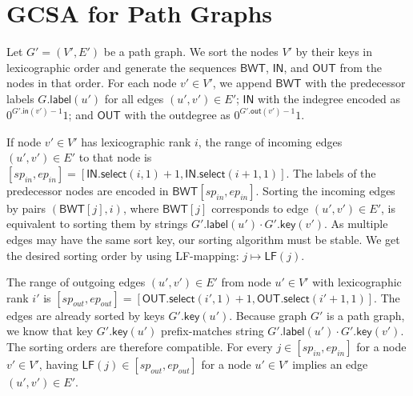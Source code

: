 \documentclass[twoside,leqno,twocolumn]{article}
\newcommand{\select}{\ensuremath{\mathsf{select}}}
\newcommand{\LF}{\ensuremath{\mathsf{LF}}}
\newcommand{\gindegree}{\ensuremath{\mathsf{in}}}
\newcommand{\goutdegree}{\ensuremath{\mathsf{out}}}
\newcommand{\glabel}{\ensuremath{\mathsf{label}}}
\newcommand{\gkey}{\ensuremath{\mathsf{key}}}
\newcommand{\LFmapping}{LF\nobreakdash-mapping}
\newcommand{\BWT}{\ensuremath{\mathsf{BWT}}}
\newcommand{\bvIN}{\ensuremath{\mathsf{IN}}}
\newcommand{\bvOUT}{\ensuremath{\mathsf{OUT}}}
\begin{document}
\section{GCSA for Path Graphs}\label{appendix:gcsa2}

Let $G' = (V', E')$ be a path graph. We sort the nodes $V'$ by their keys in lexicographic order and generate the sequences $\BWT$, $\bvIN$, and $\bvOUT$ from the nodes in that order. For each node $v' \in V'$, we append $\BWT$ with the predecessor labels $G.\glabel(u')$ for all edges $(u', v') \in E'$; $\bvIN$ with the indegree encoded as $0^{G'.\gindegree(v')-1} 1$; and $\bvOUT$ with the outdegree as $0^{G'.\goutdegree(v')-1} 1$.

If node $v' \in V'$ has lexicographic rank $i$, the range of incoming edges $(u', v') \in E'$ to that node is $[sp_{in}, ep_{in}] = [\bvIN.\select(i, 1) + 1, \bvIN.\select(i+1, 1)]$. The labels of the predecessor nodes are encoded in $\BWT[sp_{in}, ep_{in}]$. Sorting the incoming edges by pairs $(\BWT[j], i)$, where $\BWT[j]$ corresponds to edge $(u', v') \in E'$, is equivalent to sorting them by strings $G'.\glabel(u') \cdot G'.\gkey(v')$. As multiple edges may have the same sort key, our sorting algorithm must be stable. We get the desired sorting order by using \LFmapping: $j \mapsto \LF(j)$.

The range of outgoing edges $(u', v') \in E'$ from node $u' \in V'$ with lexicographic rank $i'$ is $[sp_{out}, ep_{out}] = [\bvOUT.\select(i', 1) + 1, \bvOUT.\select(i'+1, 1)]$. The edges are already sorted by keys $G'.\gkey(u')$. Because graph $G'$ is a path graph, we know that key $G'.\gkey(u')$ prefix-matches string $G'.\glabel(u') \cdot G'.\gkey(v')$. The sorting orders are therefore compatible. For every $j \in [sp_{in}, ep_{in}]$ for a node $v' \in V'$, having $\LF(j) \in [sp_{out}, ep_{out}]$ for a node $u' \in V'$ implies an edge $(u', v') \in E'$.
\end{document}
